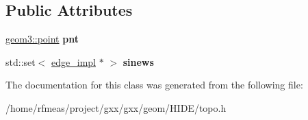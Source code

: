 \subsection*{Public Attributes}
\begin{DoxyCompactItemize}
\item 
\hyperlink{classgxx_1_1geom3_1_1point}{geom3\+::point} {\bfseries pnt}\hypertarget{classgxx_1_1topo_1_1vertex__impl_ac9ddff914615016eb164408d34ddf180}{}\label{classgxx_1_1topo_1_1vertex__impl_ac9ddff914615016eb164408d34ddf180}

\item 
std\+::set$<$ \hyperlink{classgxx_1_1topo_1_1edge__impl}{edge\+\_\+impl} $\ast$ $>$ {\bfseries sinews}\hypertarget{classgxx_1_1topo_1_1vertex__impl_a95c9ca3ac833dc98ea4caf5667557a86}{}\label{classgxx_1_1topo_1_1vertex__impl_a95c9ca3ac833dc98ea4caf5667557a86}

\end{DoxyCompactItemize}


The documentation for this class was generated from the following file\+:\begin{DoxyCompactItemize}
\item 
/home/rfmeas/project/gxx/gxx/geom/\+H\+I\+D\+E/topo.\+h\end{DoxyCompactItemize}
